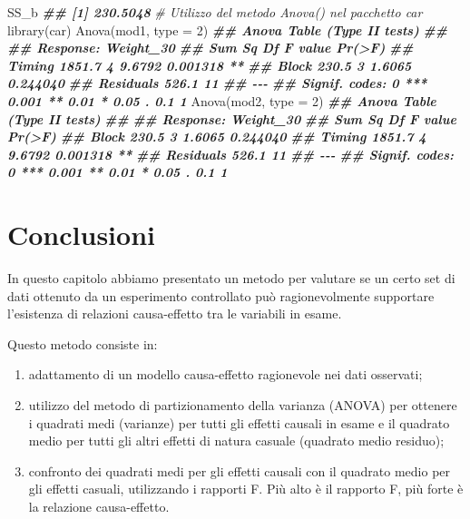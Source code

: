 \documentclass[
  12pt,
]{book}
\newenvironment{Shaded}{\begin{snugshade}}{\end{snugshade}}
\newcommand{\AttributeTok}[1]{\textcolor[rgb]{0.77,0.63,0.00}{#1}}
\newcommand{\CommentTok}[1]{\textcolor[rgb]{0.56,0.35,0.01}{\textit{#1}}}
\newcommand{\DecValTok}[1]{\textcolor[rgb]{0.00,0.00,0.81}{#1}}
\newcommand{\DocumentationTok}[1]{\textcolor[rgb]{0.56,0.35,0.01}{\textbf{\textit{#1}}}}
\newcommand{\FunctionTok}[1]{\textcolor[rgb]{0.00,0.00,0.00}{#1}}
\newcommand{\NormalTok}[1]{#1}
\providecommand{\tightlist}{%
  \setlength{\itemsep}{0pt}\setlength{\parskip}{0pt}}
\begin{document}
\begin{Shaded}
\begin{Highlighting}[]
\NormalTok{SS\_b}
\DocumentationTok{\#\# [1] 230.5048}
\CommentTok{\# Utilizzo del metodo Anova() nel pacchetto \textquotesingle{}car\textquotesingle{}}
\FunctionTok{library}\NormalTok{(car)}
\FunctionTok{Anova}\NormalTok{(mod1, }\AttributeTok{type =} \DecValTok{2}\NormalTok{)}
\DocumentationTok{\#\# Anova Table (Type II tests)}
\DocumentationTok{\#\# }
\DocumentationTok{\#\# Response: Weight\_30}
\DocumentationTok{\#\#           Sum Sq Df F value   Pr(\textgreater{}F)   }
\DocumentationTok{\#\# Timing    1851.7  4  9.6792 0.001318 **}
\DocumentationTok{\#\# Block      230.5  3  1.6065 0.244040   }
\DocumentationTok{\#\# Residuals  526.1 11                    }
\DocumentationTok{\#\# {-}{-}{-}}
\DocumentationTok{\#\# Signif. codes:  0 \textquotesingle{}***\textquotesingle{} 0.001 \textquotesingle{}**\textquotesingle{} 0.01 \textquotesingle{}*\textquotesingle{} 0.05 \textquotesingle{}.\textquotesingle{} 0.1 \textquotesingle{} \textquotesingle{} 1}
\FunctionTok{Anova}\NormalTok{(mod2, }\AttributeTok{type =} \DecValTok{2}\NormalTok{)}
\DocumentationTok{\#\# Anova Table (Type II tests)}
\DocumentationTok{\#\# }
\DocumentationTok{\#\# Response: Weight\_30}
\DocumentationTok{\#\#           Sum Sq Df F value   Pr(\textgreater{}F)   }
\DocumentationTok{\#\# Block      230.5  3  1.6065 0.244040   }
\DocumentationTok{\#\# Timing    1851.7  4  9.6792 0.001318 **}
\DocumentationTok{\#\# Residuals  526.1 11                    }
\DocumentationTok{\#\# {-}{-}{-}}
\DocumentationTok{\#\# Signif. codes:  0 \textquotesingle{}***\textquotesingle{} 0.001 \textquotesingle{}**\textquotesingle{} 0.01 \textquotesingle{}*\textquotesingle{} 0.05 \textquotesingle{}.\textquotesingle{} 0.1 \textquotesingle{} \textquotesingle{} 1}
\end{Highlighting}
\end{Shaded}

\hypertarget{conclusioni-1}{%
\section{Conclusioni}\label{conclusioni-1}}

In questo capitolo abbiamo presentato un metodo per valutare se un certo set di dati ottenuto da un esperimento controllato può ragionevolmente supportare l'esistenza di relazioni causa-effetto tra le variabili in esame.

Questo metodo consiste in:

\begin{enumerate}
\def\labelenumi{\arabic{enumi}.}
\tightlist
\item
  adattamento di un modello causa-effetto ragionevole nei dati osservati;
\item
  utilizzo del metodo di partizionamento della varianza (ANOVA) per ottenere i quadrati medi (varianze) per tutti gli effetti causali in esame e il quadrato medio per tutti gli altri effetti di natura casuale (quadrato medio residuo);
\item
  confronto dei quadrati medi per gli effetti causali con il quadrato medio per gli effetti casuali, utilizzando i rapporti F. Più alto è il rapporto F, più forte è la relazione causa-effetto.
\end{enumerate}
\end{document}
